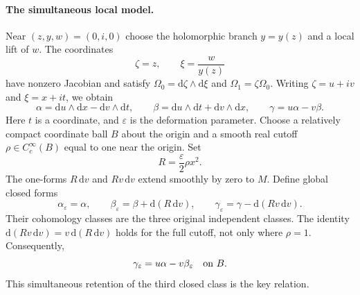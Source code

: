 \documentclass[11pt]{article}
\newcommand{\dd}{\mathrm d}
\begin{document}
\paragraph{The simultaneous local model.}
Near $(z,y,w)=(0,i,0)$ choose the holomorphic branch $y=y(z)$ and a local
lift of $w$. The coordinates
\[
 \zeta=z,\qquad \xi=\frac{w}{y(z)}
\]
have nonzero Jacobian and satisfy
$\Omega_0=\dd\zeta\wedge\dd\xi$ and $\Omega_1=\zeta\Omega_0$.
Writing $\zeta=u+iv$ and $\xi=x+it$, we obtain
\begin{equation}\label{normal}
 \alpha=\dd u\wedge\dd x-\dd v\wedge\dd t,\qquad
 \beta=\dd u\wedge\dd t+\dd v\wedge\dd x,\qquad
 \gamma=u\alpha-v\beta .
\end{equation}
Here $t$ is a coordinate, and $\varepsilon$ is the deformation parameter.
Choose a relatively compact coordinate ball $B$ about the origin and a
smooth real cutoff $\rho\in C_c^\infty(B)$ equal to one near the origin.
Set
\[
 R=\frac{\varepsilon}{2}\rho x^2.
\]
The one-forms $R\,\dd v$ and $Rv\,\dd v$ extend smoothly by zero to $M$.
Define global closed forms
\begin{equation}\label{perturb}
 \alpha_\varepsilon=\alpha,\qquad
 \beta_\varepsilon=\beta+\dd(R\,\dd v),\qquad
 \gamma_\varepsilon=\gamma-\dd(Rv\,\dd v).
\end{equation}
Their cohomology classes are the three original independent classes.
The identity $\dd(Rv\,\dd v)=v\,\dd(R\,\dd v)$ holds for the full cutoff,
not only where $\rho=1$. Consequently,
\begin{equation}\label{third}
 \gamma_\varepsilon=u\alpha-v\beta_\varepsilon\quad\hbox{on }B .
\end{equation}
This simultaneous retention of the third closed class is the key relation.
\end{document}
